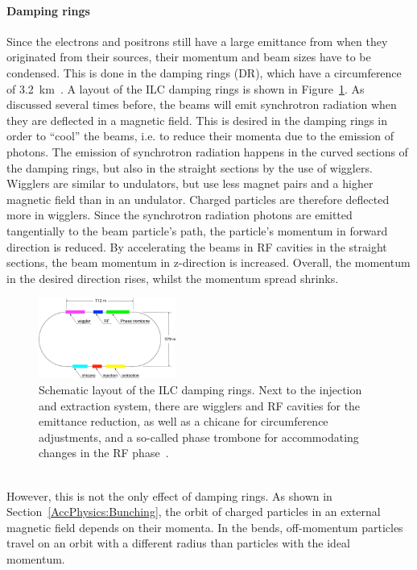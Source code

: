 \paragraph{Damping rings}
Since the electrons and positrons still have a large emittance from when they originated from their sources, their momentum and beam sizes have to be condensed.
This is done in the damping rings (DR), which have a circumference of \SI{3.2}{\kilo\meter}~\cite[p. 14]{TDR32}.
A layout of the ILC damping rings is shown in Figure~\ref{fig:DR}.
As discussed several times before, the beams will emit synchrotron radiation when they are deflected in a magnetic field.
This is desired in the damping rings in order to ``cool'' the beams, i.e. to reduce their momenta due to the emission of photons.
The emission of synchrotron radiation happens in the curved sections of the damping rings, but also in the straight sections by the use of wigglers.
Wigglers are similar to undulators, but use less magnet pairs and a higher magnetic field than in an undulator.
Charged particles are therefore deflected more in wigglers.
Since the synchrotron radiation photons are emitted tangentially to the beam particle's path,
the particle's momentum in forward direction is reduced.
By accelerating the beams in RF cavities in the straight sections, the beam momentum in z-direction is increased.
Overall, the momentum in the desired direction rises, whilst the momentum spread shrinks.
\begin{figure}[h]
\centering
\includegraphics[width=0.4\textwidth]{Figures/DR.png}
\caption[Damping ring layout]{Schematic layout of the ILC damping rings.
Next to the injection and extraction system, there are wigglers and RF cavities for the emittance reduction, as well as a chicane for circumference adjustments, and a so-called phase trombone for accommodating changes in the RF phase~\cite[p. 15]{TDR32}.}
\label{fig:DR}
\end{figure}
\\However, this is not the only effect of damping rings.
As shown in Section~\ref{AccPhysics:Bunching}, the orbit of charged particles in an external magnetic field depends on their momenta.
In the bends, off-momentum particles travel on an orbit with a different radius than particles with the ideal momentum.

